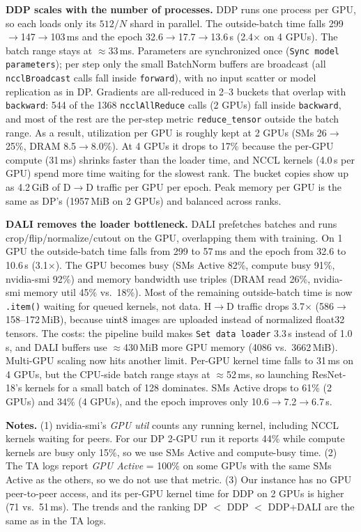 \documentclass[11pt,a4paper]{article}
\begin{document}
\textbf{DDP scales with the number of processes.} DDP runs one process per GPU, so each loads only its $512/N$ shard in parallel. The outside-batch
time falls 299$\rightarrow$147$\rightarrow$103\,ms and the epoch 32.6$\rightarrow$17.7$\rightarrow$13.6\,s (2.4$\times$ on 4 GPUs). The batch range stays
at $\approx$33\,ms. Parameters are synchronized once (\texttt{Sync model parameters}); per step only the small BatchNorm buffers are broadcast (all
\texttt{ncclBroadcast} calls fall inside \texttt{forward}), with no input scatter or model replication as in DP. Gradients are all-reduced in 2--3 buckets
that overlap with \texttt{backward}: 544 of the 1368 \texttt{ncclAllReduce} calls (2 GPUs) fall inside \texttt{backward}, and most of the rest are the
per-step metric \texttt{reduce\_tensor} outside the batch range. As a result, utilization per GPU is
roughly kept at 2 GPUs (SMs 26$\rightarrow$25\%, DRAM 8.5$\rightarrow$8.0\%). At 4 GPUs it drops to 17\% because the per-GPU compute (31\,ms) shrinks faster than the loader
time, and NCCL kernels (4.0\,s per GPU) spend more time waiting for the slowest rank. The bucket copies show up as 4.2\,GiB of D$\to$D traffic per GPU per epoch.
Peak memory per GPU is the same as DP's (1957\,MiB on 2 GPUs) and balanced across ranks.

\textbf{DALI removes the loader bottleneck.} DALI prefetches batches and runs crop/flip/normalize/cutout on the GPU, overlapping them with training.
On 1 GPU the outside-batch time falls from 299 to 57\,ms and the epoch from 32.6 to 10.6\,s (3.1$\times$). The GPU becomes busy
(SMs Active 82\%, compute busy 91\%, nvidia-smi 92\%) and memory bandwidth use triples (DRAM read 26\%, nvidia-smi memory util 45\% vs.\ 18\%). Most of the remaining
outside-batch time is now \texttt{.item()} waiting for queued kernels, not data. H$\to$D traffic drops 3.7$\times$ (586$\rightarrow$158--172\,MiB), because uint8
images are uploaded instead of normalized float32 tensors. The costs: the pipeline build makes \texttt{Set data loader} 3.3\,s instead of 1.0\,s, and DALI buffers use
$\approx$430\,MiB more GPU memory (4086 vs.\ 3662\,MiB). Multi-GPU scaling now hits another limit. Per-GPU kernel time falls to 31\,ms on 4 GPUs, but the CPU-side batch range
stays at $\approx$52\,ms, so launching ResNet-18's kernels for a small batch of 128 dominates. SMs Active drops to 61\% (2 GPUs) and 34\% (4 GPUs), and the epoch improves only 10.6$\rightarrow$7.2$\rightarrow$6.7\,s.

\textbf{Notes.} (1) nvidia-smi's \emph{GPU util} counts any running kernel, including NCCL kernels waiting for peers. For our DP 2-GPU run it reports 44\%
while compute kernels are busy only 15\%, so we use SMs Active and compute-busy time. (2) The TA logs report \emph{GPU Active} = 100\% on some GPUs with the same
SMs Active as the others, so we do not use that metric. (3) Our instance has no GPU peer-to-peer access, and its per-GPU kernel time for DDP on 2 GPUs is higher (71 vs.\ 51\,ms).
The trends and the ranking DP $<$ DDP $<$ DDP+DALI are the same as in the TA logs.
\end{document}
